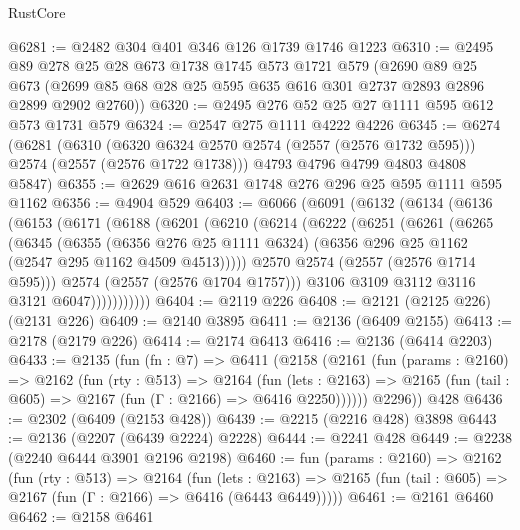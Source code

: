 \begin{lexlean}{RustCore}
\begin{coremodule}
@6281 := @2482 @304 @401 @346 @126 @1739 @1746 @1223
@6310 := @2495
    @89
    @278
    @25
    @28
    @673
    @1738
    @1745
    @573
    @1721
    @579
    (@2690
      @89
      @25
      @673
      (@2699 @85 @68 @28 @25 @595 @635 @616 @301 @2737 @2893 @2896 @2899 @2902 @2760))
@6320 := @2495 @276 @52 @25 @27 @1111 @595 @612 @573 @1731 @579
@6324 := @2547 @275 @1111 @4222 @4226
@6345 := @6274
    (@6281
      (@6310 (@6320 @6324 @2570 @2574 (@2557 (@2576 @1732 @595))) @2574 (@2557 (@2576 @1722 @1738)))
      @4793
      @4796
      @4799
      @4803
      @4808
      @5847)
@6355 := @2629 @616 @2631 @1748 @276 @296 @25 @595 @1111 @595 @1162
@6356 := @4904 @529
@6403 := @6066
    (@6091
      (@6132
        (@6134
          (@6136
            (@6153
              (@6171
                (@6188
                  (@6201
                    (@6210
                      (@6214
                        (@6222
                          (@6251
                            (@6261
                              (@6265
                                (@6345
                                  (@6355
                                    (@6356 @276 @25 @1111 @6324)
                                    (@6356 @296 @25 @1162 (@2547 @295 @1162 @4509 @4513)))))
                              @2570
                              @2574
                              (@2557 (@2576 @1714 @595)))
                            @2574
                            (@2557 (@2576 @1704 @1757)))
                          @3106
                          @3109
                          @3112
                          @3116
                          @3121
                          @6047)))))))))))
@6404 := @2119 @226
@6408 := @2121 (@2125 @226) (@2131 @226)
@6409 := @2140 @3895
@6411 := @2136 (@6409 @2155)
@6413 := @2178 (@2179 @226)
@6414 := @2174 @6413
@6416 := @2136 (@6414 @2203)
@6433 := @2135
    (fun (fn : @7) =>
    @6411
      (@2158
        (@2161
          (fun (params : @2160) =>
          @2162
            (fun (rty : @513) =>
            @2164
              (fun (lets : @2163) =>
              @2165 (fun (tail : @605) => @2167 (fun (Γ : @2166) => @6416 @2250))))))
        @2296))
    @428
@6436 := @2302 (@6409 (@2153 @428))
@6439 := @2215 (@2216 @428) @3898
@6443 := @2136 (@2207 (@6439 @2224) @2228)
@6444 := @2241 @428
@6449 := @2238 (@2240 @6444 @3901 @2196 @2198)
@6460 := fun (params : @2160) =>
  @2162
    (fun (rty : @513) =>
    @2164
      (fun (lets : @2163) =>
      @2165 (fun (tail : @605) => @2167 (fun (Γ : @2166) => @6416 (@6443 @6449)))))
@6461 := @2161 @6460
@6462 := @2158 @6461

\end{coremodule}
\end{lexlean}
